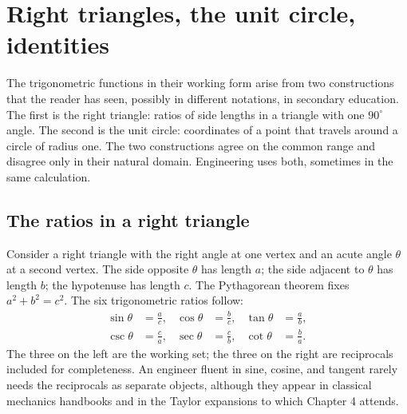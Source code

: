 \section{Right triangles, the unit circle, identities}

The trigonometric functions in their working form arise from two
constructions that the reader has seen, possibly in different
notations, in secondary education. The first is the right triangle:
ratios of side lengths in a triangle with one $90^{\circ}$ angle.
The second is the unit circle: coordinates of a point that travels
around a circle of radius one. The two constructions agree on the
common range and disagree only in their natural domain. Engineering
uses both, sometimes in the same calculation.

\subsection{The ratios in a right triangle}

Consider a right triangle with the right angle at one vertex and an
acute angle $\theta$ at a second vertex. The side opposite $\theta$
has length $a$; the side adjacent to $\theta$ has length $b$; the
hypotenuse has length $c$. The Pythagorean theorem fixes
$a^{2} + b^{2} = c^{2}$. The six trigonometric ratios follow:
\begin{align*}
\sin\theta &= \frac{a}{c}, &
\cos\theta &= \frac{b}{c}, &
\tan\theta &= \frac{a}{b}, \\
\csc\theta &= \frac{c}{a}, &
\sec\theta &= \frac{c}{b}, &
\cot\theta &= \frac{b}{a}.
\end{align*}
The three on the left are the working set; the three on the right
are reciprocals included for completeness. An engineer fluent in
sine, cosine, and tangent rarely needs the reciprocals as separate
objects, although they appear in classical mechanics handbooks and
in the Taylor expansions to which Chapter 4 attends.

